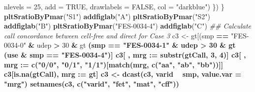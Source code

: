 \documentclass[11pt,letterpaper]{book}
\newenvironment{Shaded}{\begin{snugshade}}{\end{snugshade}}
\newcommand{\CommentTok}[1]{\textcolor[rgb]{0.56,0.35,0.01}{\textit{#1}}}
\newcommand{\DataTypeTok}[1]{\textcolor[rgb]{0.13,0.29,0.53}{#1}}
\newcommand{\DecValTok}[1]{\textcolor[rgb]{0.00,0.00,0.81}{#1}}
\newcommand{\ErrorTok}[1]{\textcolor[rgb]{0.64,0.00,0.00}{\textbf{#1}}}
\newcommand{\KeywordTok}[1]{\textcolor[rgb]{0.13,0.29,0.53}{\textbf{#1}}}
\newcommand{\NormalTok}[1]{#1}
\newcommand{\OperatorTok}[1]{\textcolor[rgb]{0.81,0.36,0.00}{\textbf{#1}}}
\newcommand{\OtherTok}[1]{\textcolor[rgb]{0.56,0.35,0.01}{#1}}
\newcommand{\StringTok}[1]{\textcolor[rgb]{0.31,0.60,0.02}{#1}}
\begin{document}
\begin{Shaded}
\begin{Highlighting}[]
{{{{{{{{{{{{{{{{{{{{{{            \DataTypeTok{nlevels =} \DecValTok{25}\NormalTok{,}
            \DataTypeTok{add =} \OtherTok{TRUE}\NormalTok{,}
            \DataTypeTok{drawlabels =} \OtherTok{FALSE}\NormalTok{,}
            \DataTypeTok{col =} \StringTok{"darkblue"}\NormalTok{)}
\NormalTok{  \})}
\NormalTok{\}}
\KeywordTok{pltSratioByPmar}\NormalTok{(}\StringTok{"S1"}\NormalTok{)}
\KeywordTok{addfiglab}\NormalTok{(}\StringTok{"A"}\NormalTok{)}
\KeywordTok{pltSratioByPmar}\NormalTok{(}\StringTok{"S2"}\NormalTok{)}
\KeywordTok{addfiglab}\NormalTok{(}\StringTok{"B"}\NormalTok{)}
\KeywordTok{pltSratioByPmar}\NormalTok{(}\StringTok{"FES-0034-4"}\NormalTok{)}
\KeywordTok{addfiglab}\NormalTok{(}\StringTok{"C"}\NormalTok{)}
\CommentTok{## Calculate call concordance between cell-free and direct for Case 3}
\NormalTok{c3 <-}\StringTok{ }\NormalTok{gt[(smp }\OperatorTok{==}\StringTok{ "FES-0034-0"} \OperatorTok{&}\StringTok{ }\NormalTok{udep }\OperatorTok{>}\StringTok{ }\DecValTok{30} \OperatorTok{&}\StringTok{ }\NormalTok{gt }\OperatorTok{%in%}\StringTok{ }\KeywordTok{c}\NormalTok{(}\StringTok{"0/0"}\NormalTok{, }\StringTok{"0/1"}\NormalTok{, }\StringTok{"1/1"}\NormalTok{)) }\OperatorTok{|}
\StringTok{           }\NormalTok{(smp }\OperatorTok{==}\StringTok{ "FES-0034-1"} \OperatorTok{&}\StringTok{ }\NormalTok{udep }\OperatorTok{>}\StringTok{ }\DecValTok{30} \OperatorTok{&}\StringTok{ }\NormalTok{gt }\OperatorTok{%in%}\StringTok{ }\KeywordTok{c}\NormalTok{(}\StringTok{"0/0"}\NormalTok{, }\StringTok{"0/1"}\NormalTok{, }\StringTok{"1/1"}\NormalTok{)) }\OperatorTok{|}
\StringTok{           }\NormalTok{(use }\OperatorTok{&}\StringTok{ }\NormalTok{smp }\OperatorTok{==}\StringTok{ "FES-0034-4"}\NormalTok{)]}
\NormalTok{c3[ , mrg }\OperatorTok{:}\ErrorTok{=}\StringTok{ }\KeywordTok{substr}\NormalTok{(gtCall, }\DecValTok{3}\NormalTok{, }\DecValTok{4}\NormalTok{)]}
\NormalTok{c3[ , mrg }\OperatorTok{:}\ErrorTok{=}\StringTok{ }\KeywordTok{c}\NormalTok{(}\StringTok{"0/0"}\NormalTok{, }\StringTok{"0/1"}\NormalTok{, }\StringTok{"1/1"}\NormalTok{)[}\KeywordTok{match}\NormalTok{(mrg, }\KeywordTok{c}\NormalTok{(}\StringTok{"aa"}\NormalTok{, }\StringTok{"ab"}\NormalTok{, }\StringTok{"bb"}\NormalTok{))]]}
\NormalTok{c3[}\KeywordTok{is.na}\NormalTok{(gtCall), mrg }\OperatorTok{:}\ErrorTok{=}\StringTok{ }\NormalTok{gt]}
\NormalTok{c3 <-}\StringTok{ }\KeywordTok{dcast}\NormalTok{(c3, varid }\OperatorTok{~}\StringTok{ }\NormalTok{smp, }\DataTypeTok{value.var =} \StringTok{"mrg"}\NormalTok{)}
\KeywordTok{setnames}\NormalTok{(c3, }\KeywordTok{c}\NormalTok{(}\StringTok{"varid"}\NormalTok{, }\StringTok{"fet"}\NormalTok{, }\StringTok{"mat"}\NormalTok{, }\StringTok{"cff"}\NormalTok{))}
}}}}}}}}}}}}}}}}}}}}}}}}
\end{Highlighting}
\end{Shaded}
\end{document}
